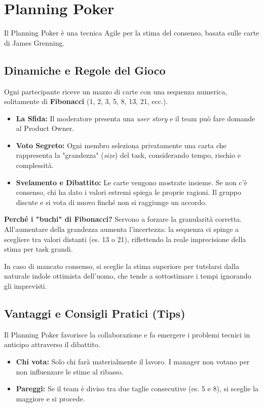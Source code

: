 \section{Planning Poker}
Il Planning Poker è una tecnica Agile per la stima del consenso, basata sulle carte di James Grenning.

\subsection{Dinamiche e Regole del Gioco}
Ogni partecipante riceve un mazzo di carte con una sequenza numerica, solitamente di \textbf{Fibonacci} (1, 2, 3, 5, 8, 13, 21, ecc.).
\begin{itemize}
    \item \textbf{La Sfida:} Il moderatore presenta una \textit{user story} e il team può fare domande al Product Owner.
    \item \textbf{Voto Segreto:} Ogni membro seleziona privatamente una carta che rappresenta la "grandezza" (\textit{size}) del task, considerando tempo, rischio e complessità.
    \item \textbf{Svelamento e Dibattito:} Le carte vengono mostrate insieme. Se non c'è consenso, chi ha dato i valori estremi spiega le proprie ragioni. Il gruppo discute e si vota di nuovo finché non si raggiunge un accordo.
\end{itemize}

\begin{notaesame}
\textbf{Perché i "buchi" di Fibonacci?} Servono a forzare la granularità corretta. All'aumentare della grandezza aumenta l'incertezza: la sequenza ci spinge a scegliere tra valori distanti (es. 13 o 21), riflettendo la reale imprecisione della stima per task grandi.
\end{notaesame}

\begin{notaprof}
In caso di mancato consenso, si sceglie la stima superiore per tutelarsi dalla naturale indole ottimista dell'uomo, che tende a sottostimare i tempi ignorando gli imprevisti.
\end{notaprof}

\subsection{Vantaggi e Consigli Pratici (Tips)}
Il Planning Poker favorisce la collaborazione e fa emergere i problemi tecnici in anticipo attraverso il dibattito.

\begin{itemize}
    \item \textbf{Chi vota:} Solo chi farà materialmente il lavoro. I manager non votano per non influenzare le stime al ribasso.
    \item \textbf{Pareggi:} Se il team è diviso tra due taglie consecutive (es. 5 e 8), si sceglie la maggiore e si procede.
\end{itemize}

